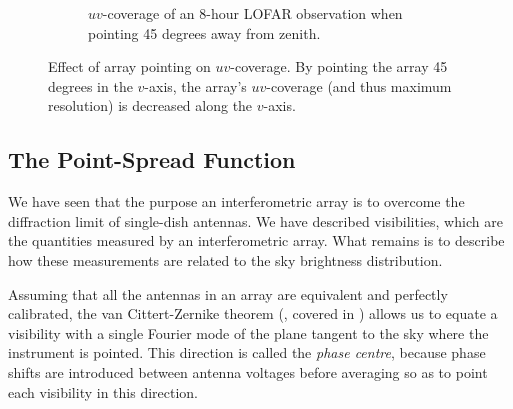 \begin{figure}[ht]
\begin{subfigure}{.40\textwidth}
\caption{\label{fig.lofar.uvcoverage.elsewhere} $uv$-coverage of an 8-hour LOFAR observation when pointing 45 degrees away from zenith.}
\end{subfigure}
\caption{\label{fig.uvcoverage.lofar} Effect of array pointing on $uv$-coverage. By pointing the array 45 degrees in the $v$-axis, the array's $uv$-coverage (and thus maximum resolution) is decreased along the $v$-axis.}
\end{figure}


\subsection{The Point-Spread Function}\label{sec.imag.psf}

\pg
We have seen that the purpose an interferometric array is to overcome the diffraction limit of single-dish antennas. We have described visibilities, which are the quantities measured by an interferometric array. What remains is to describe how these measurements are related to the sky brightness distribution.

\pg
Assuming that all the antennas in an array are equivalent and perfectly calibrated, the van Cittert-Zernike theorem (, covered in ) allows us to equate a visibility with a single Fourier mode of the plane tangent to the sky where the instrument is pointed. This direction is called the \emph{phase centre}, because phase shifts are introduced between antenna voltages before averaging so as to point each visibility in this direction. 


